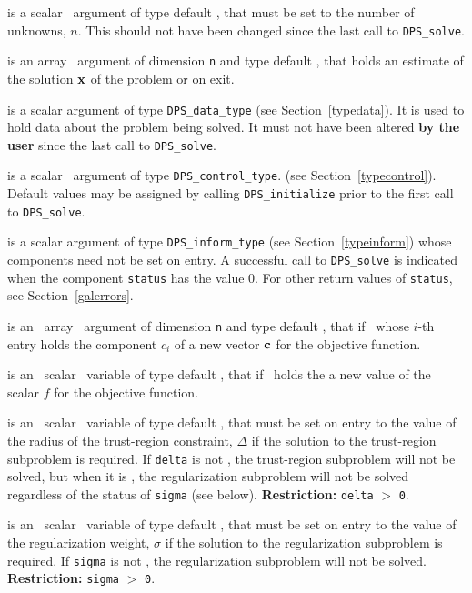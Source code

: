 \documentclass{galahad}
\newcommand{\packagename}{DPS}
\begin{document}
\begin{description}

 is a scalar \intentin\ argument of type default \integer, that must be
set to the number of unknowns, $n$. This should not have been changed
since the last call to {\tt \packagename\_solve}.

 is an array \intentout\ argument of dimension {\tt n} and
type default \realdp, that holds an estimate of the solution ${\mathbf{x}}$
of the problem  or  on exit.

 is a scalar \intentinout argument of type
{\tt \packagename\_data\_type}
(see Section~\ref{typedata}). It is used to hold data about the problem being
solved. It must not have been altered {\bf by the user} since the last call to
{\tt \packagename\_solve}.

 is a scalar \intentin\ argument of type
{\tt \packagename\_control\_type}.
(see Section~\ref{typecontrol}).
Default values may be assigned by calling {\tt \packagename\_initialize}
prior to the first call to {\tt \packagename\_solve}.

 is a scalar \intentinout argument of type
{\tt \packagename\_inform\_type}
(see Section~\ref{typeinform}) whose components need not be set on entry.
A successful call to
{\tt \packagename\_solve}
is indicated when the  component {\tt status} has the value 0.
For other return values of {\tt status}, see Section~\ref{galerrors}.

 is an \optional\ array \intentin\ argument of dimension {\tt n} and
type default \realdp, that if \present\ whose $i$-th entry holds the
component $c_i$ of a new vector ${\mathbf{c}}$ for the objective function.

 is an \optional\ scalar \intentin\ variable of type default \realdp,
that if \present\ holds the a new value of the scalar
$f$ for the objective function.

 is an \optional\ scalar \intentin\ variable of type default
\realdp, that must be set on entry
to the value of the radius of the trust-region constraint, $\Delta$
if the solution to the trust-region subproblem  is required.
If {\tt delta} is not \present, the trust-region subproblem will not be
solved, but when it is \present, the regularization subproblem will not be
solved regardless of the status of {\tt sigma} (see below).
{\bf Restriction: } {\tt delta} $>$ {\tt 0}.

 is an \optional\ scalar \intentin\ variable of type default
\realdp, that must be set on entry
to the value of the regularization weight, $\sigma$
if the solution to the regularization subproblem  is required.
If {\tt sigma} is not \present, the regularization subproblem will not be
solved.
{\bf Restriction: } {\tt sigma} $>$ {\tt 0}.


\end{description}
\end{document}
